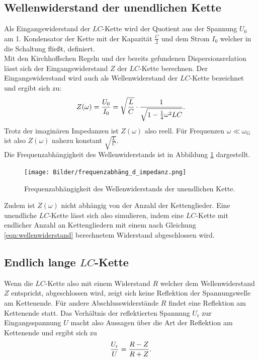 \subsection{Wellenwiderstand der unendlichen Kette}
Als Eingangswiderstand der $LC$-Kette wird der Quotient aus der Spannung $U_{\mathrm{0}}$ am 1. Kondensator der Kette mit der Kapazität $\frac{C}{2}$ und dem Strom $I_{\mathrm{0}}$ welcher in die Schaltung fließt, definiert.\\
Mit den Kirchhoffschen Regeln und der bereits gefundenen Dispersionsrelation lässt sich der Eingangswiderstand $Z$ der $LC$-Kette berechnen.
Der Eingangswiderstand wird auch als Wellenwiderstand der $LC$-Kette bezeichnet und ergibt sich zu:
\begin{equation}
	\centering
	\label{eqn:wellenwiderstand}
	Z(\omega)=\frac{U_{\mathrm{0}}}{I_{\mathrm{0}}}=\sqrt{\frac{L}{C}}\cdot \frac{1}{\sqrt{1-\frac{1}{4}\omega^2LC}}.
\end{equation}
Trotz der imaginären Impedanzen ist $Z(\omega)$ also reell.
Für Frequenzen $\omega \ll \omega_{\mathrm{G}}$ ist also $Z(\omega)$ nahezu konstant $\sqrt{\frac{L}{C}}$.\\
Die Frequenzabhängigkeit des Wellenwiderstands ist in Abbildung \ref{fig:impedanz} dargestellt.
\begin{figure}
	\centering
	\texttt{[image: Bilder/frequenzabhäng\_d\_impedanz.png]}
	\caption{Frequenzabhängigkeit des Wellenwiderstands der unendlichen Kette. \cite{Anleitung}}
	\label{fig:impedanz}
\end{figure}
Zudem ist $Z(\omega)$ nicht abhängig von der Anzahl der Kettenglieder. Eine unendliche $LC$-Kette lässt sich also simulieren, indem eine $LC$-Kette mit endlicher Anzahl an Kettengliedern mit einem nach Gleichung \eqref{eqn:wellenwiderstand} berechnetem Widerstand abgeschlossen wird.
\FloatBarrier

\subsection{Endlich lange $LC$-Kette}
Wenn die $LC$-Kette also mit einem Widerstand $R$ welcher dem Wellenwiderstand $Z$ entspricht, abgeschlossen wird, zeigt sich keine
Reflektion der Spannungswelle am Kettenende.
Für andere Abschlusswiderstände $R$ findet eine Reflektion am Kettenende statt.
Das Verhältnis der reflektierten Spannung $U_{\mathrm{r}}$ zur Eingangsspannung $U$ macht also Aussagen über die Art der Reflektion am Kettenende und ergibt sich zu
\begin{equation}
	\centering
	\label{eqn:abschluss}
	\frac{U_{\mathrm{r}}}{U}=\frac{R-Z}{R+Z}.
\end{equation}

